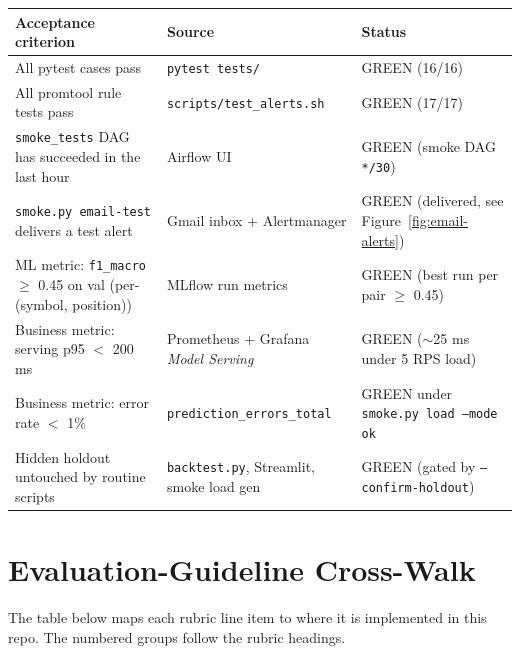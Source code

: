 \documentclass[11pt,a4paper]{article}
\begin{document}
\begin{tabularx}{\linewidth}{@{}Xll@{}}
\toprule
\textbf{Acceptance criterion} & \textbf{Source} & \textbf{Status} \\
\midrule
All pytest cases pass                                                  & \texttt{pytest tests/}                       & GREEN (16/16) \\
All promtool rule tests pass                                            & \texttt{scripts/test\_alerts.sh}             & GREEN (17/17) \\
\texttt{smoke\_tests} DAG has succeeded in the last hour                & Airflow UI                                   & GREEN (smoke DAG \texttt{*/30}) \\
\texttt{smoke.py email-test} delivers a test alert                      & Gmail inbox + Alertmanager                   & GREEN (delivered, see Figure~\ref{fig:email-alerts}) \\
ML metric: \texttt{f1\_macro} $\geq$ 0.45 on val (per-(symbol, position)) & MLflow run metrics                          & GREEN (best run per pair $\geq$ 0.45) \\
Business metric: serving p95 $<$ 200 ms                                 & Prometheus + Grafana \emph{Model Serving}    & GREEN ($\sim$25 ms under 5 RPS load) \\
Business metric: error rate $<$ 1\%                                     & \texttt{prediction\_errors\_total}           & GREEN under \texttt{smoke.py load --mode ok} \\
Hidden holdout untouched by routine scripts                             & \texttt{backtest.py}, Streamlit, smoke load gen & GREEN (gated by \texttt{--confirm-holdout}) \\
\bottomrule
\end{tabularx}


\section{Evaluation-Guideline Cross-Walk}

The table below maps each rubric line item to where it is implemented in this repo. The numbered groups follow the rubric headings.
\end{document}
